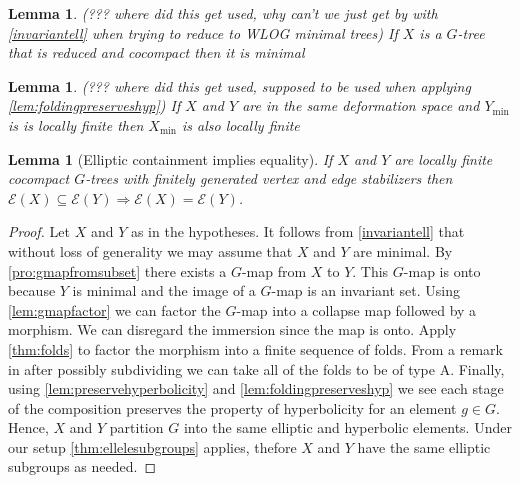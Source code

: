 \documentclass[12pt,parskip=full]{report}
\theoremstyle{plain}
\newtheorem{lem}[thm]{Lemma}
\theoremstyle{definition}
\begin{document}
\begin{lem}
    \label{reducedcocompact}
    (??? where did this get used, why can't we just get by with \ref{invariantell} when trying to reduce to WLOG minimal trees)
    If \(X\) is a \(G\)-tree that is reduced and cocompact then it is minimal
\end{lem}

\begin{lem}
    (??? where did this get used, supposed to be used when applying \ref{lem:foldingpreserveshyp})
    If \(X\) and \(Y\) are in the same deformation space and \(Y_\text{min}\) is is locally finite then \(X_\text{min}\) is also locally finite
\end{lem}

\begin{lem}
    [Elliptic containment implies equality]
    \label{thm:ellipticimpliesequality} 
    If \(X\) and \(Y\) are locally finite cocompact \(G\)-trees with finitely generated vertex and edge stabilizers then \(\mathcal{E}(X) \subseteq \mathcal{E}(Y) \Longrightarrow \mathcal{E}(X) = \mathcal{E}(Y) \). 
\end{lem}
\begin{proof}

    Let \(X\) and \(Y\) as in the hypotheses. It follows from \ref{invariantell} that without loss of generality we may assume that \(X\) and \(Y\) are minimal. By \ref{pro:gmapfromsubset} there exists a \(G\)-map from \(X\) to \(Y\). This \(G\)-map is onto because \(Y\) is minimal and the image of a \(G\)-map is an invariant set. Using \ref{lem:gmapfactor} we can factor the \(G\)-map into a collapse map followed by a morphism. We can disregard the immersion since the map is onto. Apply \ref{thm:folds} to factor the morphism into a finite sequence of folds. From a remark in \cite{boundingcomplexity} after possibly subdividing we can take all of the folds to be of type A. Finally, using \ref{lem:preservehyperbolicity} and \ref{lem:foldingpreserveshyp} we see each stage of the composition preserves the property of hyperbolicity for an element \(g\in G\). Hence, \(X\) and \(Y\) partition \(G\) into the same elliptic and hyperbolic elements. Under our setup \ref{thm:ellelesubgroups} applies, thefore \(X\) and \(Y\) have the same elliptic subgroups as needed.
\end{proof}
\end{document}
